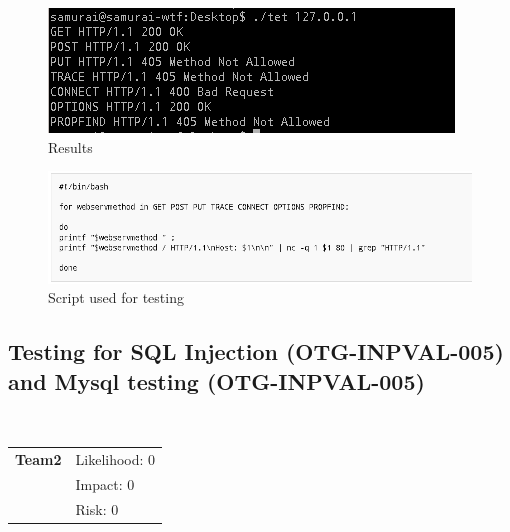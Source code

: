 \documentclass[headsepline,footsepline,footinclude=false,oneside,fontsize=11pt,paper=a4,listof=totoc,bibliography=totoc]{scrbook} %
\begin{document}
\begin{figure}
	\includegraphics[width=\linewidth]{logos/methods.jpg}
	\caption{Results}
	\label{fig:test}
\end{figure}

\begin{figure}
	\includegraphics[width=\linewidth]{script.png}
	\caption{Script used for testing}
	\label{fig:script}
\end{figure}

\pagebreak
\subsection{Testing for SQL Injection (OTG-INPVAL-005) and Mysql testing (OTG-INPVAL-005)}\


\begin{tabular}{cR{12cm}}
	\textbf{Team2} & Likelihood: 0\\& Impact: 0\\& Risk: 0
\end{tabular}
\end{document}
